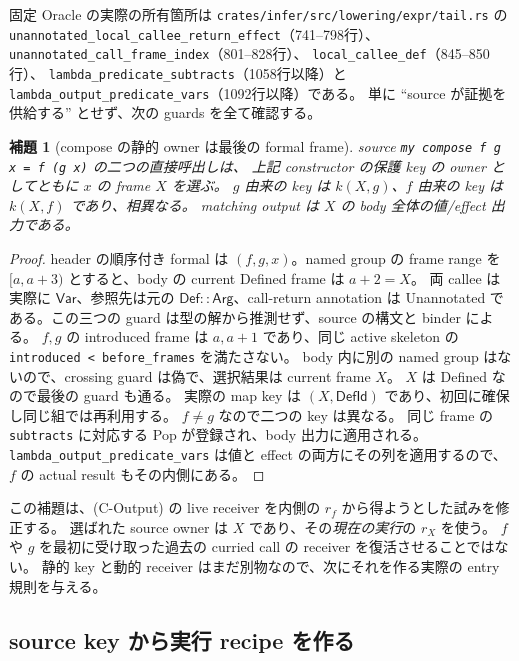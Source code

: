\documentclass[11pt,a4paper]{article}
\newtheorem{lemma}[definition]{補題}
\begin{document}
固定 Oracle の実際の所有箇所は
\nolinkurl{crates/infer/src/lowering/expr/tail.rs} の
\nolinkurl{unannotated_local_callee_return_effect}（741--798行）、
\nolinkurl{unannotated_call_frame_index}（801--828行）、
\nolinkurl{local_callee_def}（845--850行）、
\nolinkurl{lambda_predicate_subtracts}（1058行以降）と
\nolinkurl{lambda_output_predicate_vars}（1092行以降）である。
単に ``source が証拠を供給する'' とせず、次の guards を全て確認する。

\begin{lemma}[compose の静的 owner は最後の formal frame]
\label{lem:compose-static}
source \texttt{my compose f g x = f (g x)} の二つの直接呼出しは、
上記 constructor の保護 key の owner としてともに \(x\) の frame \(X\) を選ぶ。
\(g\) 由来の key は \(k(X,g)\)、\(f\) 由来の key は \(k(X,f)\) であり、相異なる。
matching output は \(X\) の body 全体の値/effect 出力である。
\end{lemma}
\begin{proof}
header の順序付き formal は \((f,g,x)\)。named group の frame range を
\([a,a+3)\) とすると、body の current Defined frame は \(a+2=X\)。
両 callee は実際に \(\mathsf{Var}\)、参照先は元の \(\mathsf{Def::Arg}\)、call-return annotation は
Unannotated である。この三つの guard は型の解から推測せず、source の構文と binder による。
\(f,g\) の introduced frame は \(a,a+1\) であり、同じ active skeleton の
\texttt{introduced < before\_frames} を満たさない。
body 内に別の named group はないので、crossing guard は偽で、選択結果は current frame \(X\)。
\(X\) は Defined なので最後の guard も通る。
実際の map key は \((X,\mathsf{DefId})\) であり、初回に確保し同じ組では再利用する。
\(f\ne g\) なので二つの key は異なる。
同じ frame の \texttt{subtracts} に対応する Pop が登録され、body 出力に適用される。
\nolinkurl{lambda_output_predicate_vars} は値と effect の両方にその列を適用するので、
\(f\) の actual result もその内側にある。
\end{proof}

この補題は、(C-Output) の live receiver を内側の \(r_f\) から得ようとした試みを修正する。
選ばれた source owner は \(X\) であり、その\emph{現在の実行}の \(r_X\) を使う。
\(f\) や \(g\) を最初に受け取った過去の curried call の receiver を復活させることではない。
静的 key と動的 receiver はまだ別物なので、次にそれを作る実際の entry 規則を与える。

\subsection{source key から実行 recipe を作る}
\end{document}
